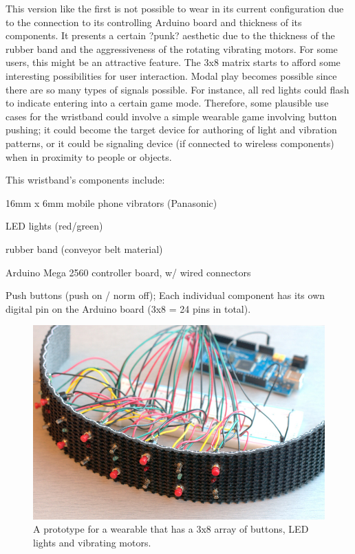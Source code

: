 \documentclass{chi-ext}
\begin{document}
This version like the first is not possible to wear in its current configuration due to the connection to its controlling Arduino board and thickness of its components. It presents a certain ?punk? aesthetic due to the thickness of the rubber band and the aggressiveness of the rotating vibrating motors. For some users, this might be an attractive feature. The 3x8 matrix starts to afford some interesting possibilities for user interaction. Modal play becomes possible since there are so many types of signals possible. For instance, all red lights could flash to indicate entering into a certain game mode. Therefore, some plausible use cases for the wristband could involve a simple wearable game involving button pushing; it could become the target device for authoring of light and vibration patterns, or it could be signaling device (if connected to wireless components) when in proximity to people or objects.

This wristband's components include:
\begin{inparaenum}
\item 16mm x 6mm mobile phone vibrators (Panasonic)
\item LED lights (red/green)
\item rubber band (conveyor belt material)
\item Arduino Mega 2560 controller board, w/ wired connectors
\item Push buttons (push on / norm off); Each individual component has its own digital pin on the Arduino board (3x8 = 24 pins in total).
\end{inparaenum}

\begin{figure}
  \begin{center}
  \includegraphics[width=\columnwidth]{images/P1130396.jpg}
  \caption{A prototype for a wearable that has a 3x8 array of buttons, LED lights and vibrating motors.}
  \label{fig:marginparsample}
  \end{center}  
\end{figure}
\end{document}
